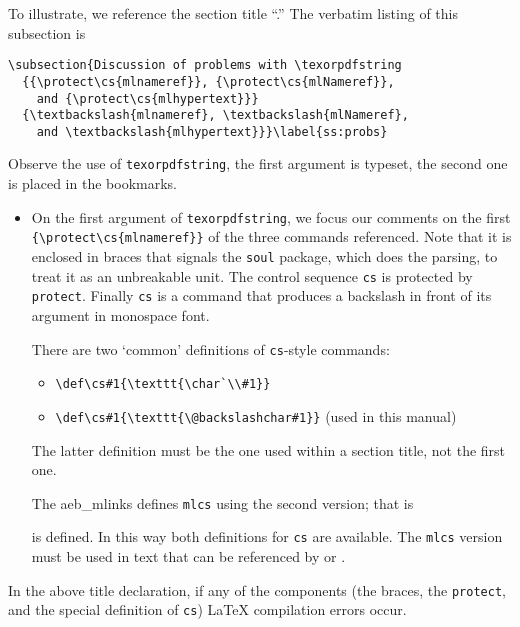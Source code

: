 \documentclass{article}
\makeatletter
\edef\amtIndent{\the\parindent}
\let\pkg\textsf
\let\opt\texttt
\def\cs#1{\texttt{\@backslashchar#1}}
\makeatother
\begin{document}
To illustrate, we reference the section title ``.'' The verbatim listing of this subsection is
\begin{Verbatim}[xleftmargin=\amtIndent,fontsize=\small,commandchars=!()]
\subsection{Discussion of problems with \texorpdfstring
  {{\protect\cs{mlnameref}}, {\protect\cs{mlNameref}},
    and {\protect\cs{mlhypertext}}}
  {\textbackslash{mlnameref}, \textbackslash{mlNameref},
    and \textbackslash{mlhypertext}}}\label{ss:probs}
\end{Verbatim}
Observe the use of \cs{texorpdfstring}, the first argument is typeset, the second
one is placed in the bookmarks.
\begin{itemize}
  \item On the first argument of \cs{texorpdfstring}, we focus our comments
      on the first \verb~{\protect\cs{mlnameref}}~ of the three commands
      referenced. Note that it is enclosed in braces that signals the
      \opt{soul} package, which does the parsing, to treat it as an
      unbreakable unit. The control sequence \cs{cs} is protected by
      \cs{protect}. Finally \cs{cs} is a command that produces a backslash in
      front of its argument in monospace font.

      There are two `common' definitions of \cs{cs}-style commands:
      \begin{itemize}
        \item \verb~\def\cs#1{\texttt{\char`\\#1}}~
        \item \verb~\def\cs#1{\texttt{\@backslashchar#1}}~ (used in this manual)
      \end{itemize}
      The latter definition must be the one used within a section title, not the first one.

      The \pkg{aeb\_mlinks} defines \cs{mlcs} using the second version; that
      is  is defined. In
      this way both definitions for \cs{cs} are available. The \cs{mlcs}
      version must be used in text that can be referenced by 
      or .
\end{itemize}
In the above title declaration, if any of the components (the braces, the \cs{protect}, and the special
definition of \cs{cs}) {\LaTeX} compilation errors occur.
\end{document}
